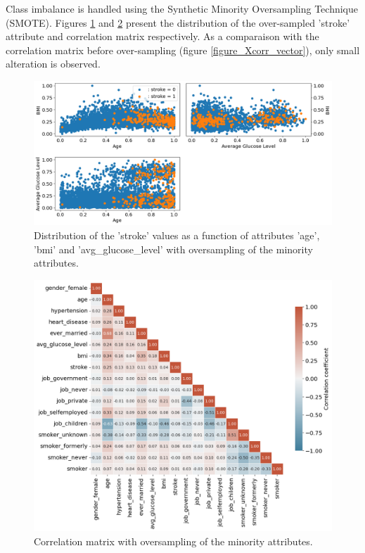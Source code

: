 Class imbalance is handled using the Synthetic Minority Oversampling Technique (SMOTE). Figures 
\ref{distribution_stroke_01_over} and \ref{figure_Xcorr_over} present the distribution of the 
over-sampled 'stroke' attribute and correlation matrix respectively. As a comparaison with the 
correlation matrix before over-sampling (figure \ref{figure_Xcorr_vector}), only small alteration 
is observed.

\begin{figure}[H]
\centering
\includegraphics[scale=0.5]{../figures/plot_ageBMIAvgGlucoseLevel_stroke01_over.png}
\caption{Distribution of the 'stroke' values as a function of attributes 'age', 'bmi' and 'avg\_glucose\_level' with oversampling of the minority attributes.}
\label{distribution_stroke_01_over}
\end{figure}

\begin{figure}[H]
\centering
\includegraphics[scale=0.5]{../figures/correlationMatrix_over.png}
\caption{Correlation matrix with oversampling of the minority attributes.}
\label{figure_Xcorr_over}
\end{figure}

